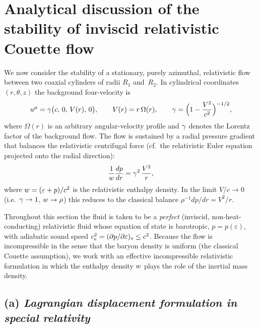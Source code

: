 
\section{Analytical discussion of the stability of inviscid relativistic
  Couette flow}
\label{sec:rel-7-67}

We now consider the stability of a stationary, purely azimuthal,
relativistic flow between two coaxial cylinders of radii $R_1$ and~$R_2$.
In cylindrical coordinates $(r,\theta,z)$ the background four-velocity
is
\begin{equation}
\label{eq:rel-7-33}
u^\mu = \gamma\bigl(c,\,0,\,V(r),\,0\bigr),\qquad
V(r) = r\,\Omega(r),\qquad
\gamma = \Bigl(1-\frac{V^2}{c^2}\Bigr)^{-1/2},
\end{equation}
where $\Omega(r)$ is an arbitrary angular-velocity profile and
$\gamma$ denotes the Lorentz factor of the background flow.
The flow is sustained by a radial pressure gradient that balances
the relativistic centrifugal force (cf.\ the relativistic Euler
equation projected onto the radial direction):
\begin{equation}
\label{eq:rel-7-33b}
\frac{1}{w}\frac{dp}{dr}
= \gamma^{2}\,\frac{V^{2}}{r},
\end{equation}
where $w = (\varepsilon + p)/c^{2}$ is the relativistic
enthalpy density.  In the limit $V/c\to0$ (i.e.\ $\gamma\to1$,
$w\to\rho$) this reduces to the classical balance
$\rho^{-1}dp/dr = V^{2}/r$.

Throughout this section the fluid is taken to be a \emph{perfect}
(inviscid, non-heat-conducting) relativistic fluid whose equation of
state is barotropic, $p = p(\varepsilon)$, with adiabatic sound speed
$c_{\mathrm{s}}^{2}=(\partial p/\partial\varepsilon)_s\le c^{2}$.
Because the flow is incompressible in the sense that the
baryon density is uniform (the classical Couette assumption),
we work with an effective incompressible relativistic formulation
in which the enthalpy density $w$ plays the role of the
inertial mass density.

\subsection*{(a) \emph{Lagrangian displacement formulation in special
  relativity}}
\label{sec:rel-7-67a}

